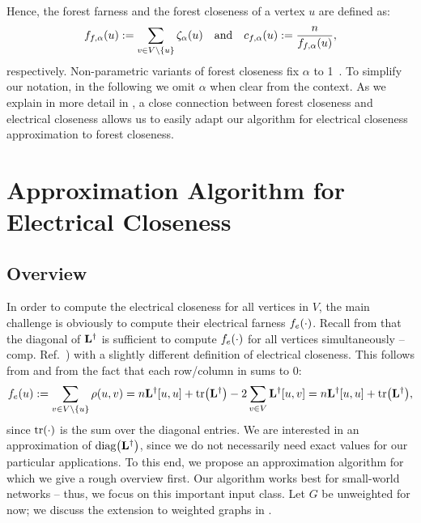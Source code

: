Hence, the forest farness and the forest closeness of a vertex $u$ are defined as:
%
\begin{equation}
\label{eq:el-clos:forest-clos}
\ffarnp(u) := \sum_{v \in V \setminus \set{u}}\fdistp(u)\quad \text{and}\quad
\fclosp(u) := \frac{n}{\ffarnp(u)},
\end{equation}
%
respectively. Non-parametric variants of forest closeness fix $\alpha$ to
1~\cite{DBLP:journals/corr/abs-math-0602073}. To simplify our notation, in the
following we omit $\alpha$ when clear from the context. As we explain in more
detail in , a close connection between
forest closeness and electrical closeness allows us to easily adapt our
algorithm for electrical closeness approximation to forest closeness.

\section{Approximation Algorithm for Electrical Closeness}
\label{sec:el-clos:apx-algo}
\subsection{Overview}
In order to compute the electrical closeness for all vertices in $V$, the main challenge
is obviously to compute their electrical farness $f_e(\cdot)$. Recall from
 that the diagonal of $\mathbf{L}^\dagger$ is sufficient to compute
$f_e(\cdot)$ for all vertices simultaneously
-- comp. Ref.~\cite[Eq. (15)]{DBLP:journals/socnet/BozzoF13}) with a slightly different
definition of electrical closeness.
This follows from  and from the fact that each row/column in
\Linv sums to 0:
%
\[
\elfarn(u) :=
\sum_{v \in V \setminus \set{u}}\rdist(u, v) = n \Linv[u, u] + \tr{\Linv} - 2\sum_{v\in V}\Linv[u, v] =
n\Linv[u, u] + \tr{\Linv},
\]
%
since $\tr{\cdot}$ is the sum over the diagonal entries.
We are interested in an approximation of $\diag{\Linv}$, since we do not necessarily
need exact values for our particular applications. To this end, we propose an approximation
algorithm for which we give a rough overview first.
Our algorithm works best for small-world networks -- thus, we focus on this important
input class. Let $G$ be unweighted for now; we discuss the extension to weighted graphs
in .

